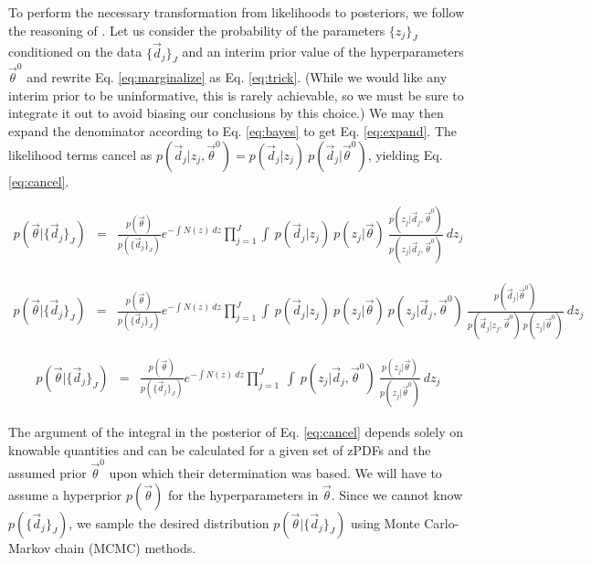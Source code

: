 \documentclass[preprint]{aastex}
\begin{document}
To perform the necessary transformation from likelihoods to posteriors, we follow the reasoning of \citet{mar15}.  Let us consider the probability of the parameters $\{z_{j}\}_{J}$ conditioned on the data $\{\vec{d}_{j}\}_{J}$ and an interim prior value of the hyperparameters $\vec{\theta}^{0}$ and rewrite Eq. \ref{eq:marginalize} as Eq. \ref{eq:trick}.  (While we would like any interim prior to be uninformative, this is rarely achievable, so we must be sure to integrate it out to avoid biasing our conclusions by this choice.)  We may then expand the denominator according to Eq. \ref{eq:bayes} to get Eq. \ref{eq:expand}.  The likelihood terms cancel as $p(\vec{d}_{j}|z_{j},\vec{\theta}^{0})=p(\vec{d}_{j}|z_{j})\ p(\vec{d}_{j}|\vec{\theta}^{0})$, yielding Eq. \ref{eq:cancel}.

\begin{eqnarray}
\label{eq:trick}
p(\vec{\theta}|\{\vec{d}_{j}\}_{J}) &=& \frac{p(\vec{\theta})}{p(\{\vec{d}_{j}\}_{J})}e^{-\int N(z)\ dz}\prod_{j=1}^{J}\int\ p(\vec{d}_{j}|z_{j})\ p(z_{j}|\vec{\theta})\ \frac{p(z_{j}|\vec{d}_{j},\vec{\theta}^{0})}{p(z_{j}|\vec{d}_{j},\vec{\theta}^{0})}\ dz_{j}
\end{eqnarray}

\begin{eqnarray}
\label{eq:expand}
p(\vec{\theta}|\{\vec{d}_{j}\}_{J}) &=& \frac{p(\vec{\theta})}{p(\{\vec{d}_{j}\}_{J})}e^{-\int N(z)\ dz}\prod_{j=1}^{J}\int\ p(\vec{d}_{j}|z_{j})\ p(z_{j}|\vec{\theta})\ p(z_{j}|\vec{d}_{j},\vec{\theta}^{0})\ \frac{p(\vec{d}_{j}|\vec{\theta}^{0})}{p(\vec{d}_{j}|z_{j},\vec{\theta}^{0})\ p(z_{j}|\vec{\theta}^{0})}\ dz_{j}
\end{eqnarray}

\begin{eqnarray}
\label{eq:cancel}
p(\vec{\theta}|\{\vec{d}_{j}\}_{J}) &=& \frac{p(\vec{\theta})}{p(\{\vec{d}_{j}\}_{J})}e^{-\int N(z)\ dz}\prod_{j=1}^{J}\ \int\ p(z_{j}|\vec{d}_{j},\vec{\theta}^{0})\ \frac{p(z_{j}|\vec{\theta})}{p(z_{j}|\vec{\theta}^{0})}\ dz_{j}
\end{eqnarray}

The argument of the integral in the posterior of Eq. \ref{eq:cancel} depends solely on knowable quantities and can be calculated for a given set of zPDFs and the assumed prior $\vec{\theta}^{0}$ upon which their determination was based.  We will have to assume a hyperprior $p(\vec{\theta})$ for the hyperparameters in $\vec{\theta}$.  Since we cannot know $p(\{\vec{d}_{j}\}_{J})$, we sample the desired distribution $p(\vec{\theta}|\{\vec{d}_{j}\}_{J})$ using Monte Carlo-Markov chain (MCMC) methods.  
\end{document}

